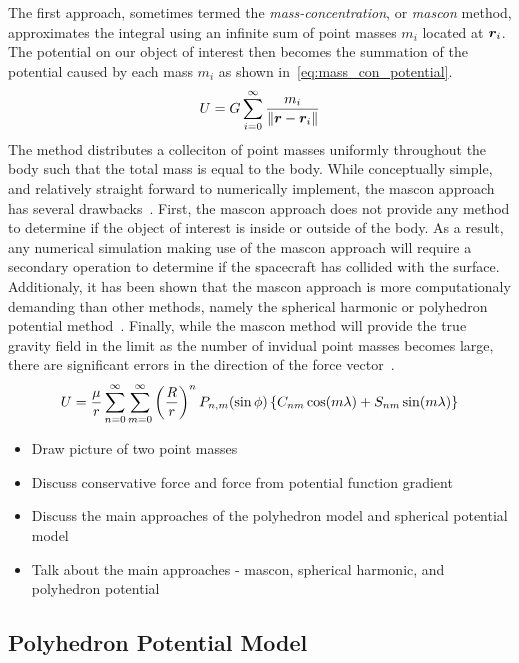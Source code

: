 The first approach, sometimes termed the \textit{mass-concentration}, or \textit{mascon} method, approximates the integral using an infinite sum of point masses \( m_i\) located at \( \bm{r}_i \).
The potential on our object of interest then becomes the summation of the potential caused by each mass \( m_i \) as shown in~\cref{eq:mass_con_potential}.
\begin{align}\label{eq:mass_con_potential}
    U = G \sum_{i=0}^{\infty} \frac{m_i}{\left\| \bm{r} - \bm{r}_i \right\|}
\end{align}
The method distributes a colleciton of point masses uniformly throughout the body such that the total mass is equal to the body.
While conceptually simple, and relatively straight forward to numerically implement, the mascon approach has several drawbacks~\cite{scheeres2012a}.
First, the mascon approach does not provide any method to determine if the object of interest is inside or outside of the body.
As a result, any numerical simulation making use of the mascon approach will require a secondary operation to determine if the spacecraft has collided with the surface.
Additionaly, it has been shown that the mascon approach is more computationaly demanding than other methods, namely the spherical harmonic or polyhedron potential method~\cite{werner1996}.
Finally, while the mascon method will provide the true gravity field in the limit as the number of invidual point masses becomes large, there are significant errors in the direction of the force vector~\cite{werner1996}.
\begin{align}\label{eq:spherical_harmonic}
    U = \frac{\mu}{r} \sum_{n=0}^\infty \sum_{m=0}^\infty \left( \frac{R}{r} \right)^nP_{n,m}(\sin \phi) \left\{  C_{nm} \cos(m \lambda) + S_{nm} \sin(m \lambda) \right\}
\end{align}

\begin{itemize}
    \item Draw picture of two point masses
    \item Discuss conservative force and force from potential function gradient
    \item Discuss the main approaches of the polyhedron model and spherical potential model
    \item Talk about the main approaches - mascon, spherical harmonic, and polyhedron potential
\end{itemize}

\subsection{Polyhedron Potential Model}\label{sec:polyhedron_potential}


